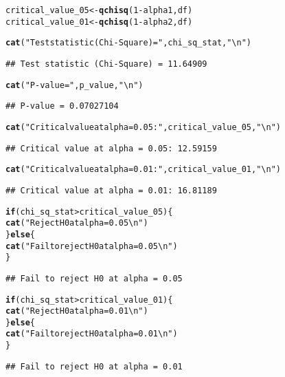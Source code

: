 \documentclass{article}\usepackage[]{graphicx}\usepackage[]{xcolor}
\makeatletter
\newcommand{\hlnum}[1]{\textcolor[rgb]{0.686,0.059,0.569}{#1}}%
\newcommand{\hlsng}[1]{\textcolor[rgb]{0.192,0.494,0.8}{#1}}%
\newcommand{\hlopt}[1]{\textcolor[rgb]{0,0,0}{#1}}%
\newcommand{\hldef}[1]{\textcolor[rgb]{0.345,0.345,0.345}{#1}}%
\newcommand{\hlkwa}[1]{\textcolor[rgb]{0.161,0.373,0.58}{\textbf{#1}}}%
\newcommand{\hlkwb}[1]{\textcolor[rgb]{0.69,0.353,0.396}{#1}}%
\newcommand{\hlkwd}[1]{\textcolor[rgb]{0.737,0.353,0.396}{\textbf{#1}}}%
\newenvironment{kframe}{%
 \def\at@end@of@kframe{}%
 \ifinner\ifhmode%
  \def\at@end@of@kframe{\end{minipage}}%
  \begin{minipage}{\columnwidth}%
 \fi\fi%
 \def\FrameCommand##1{\hskip\@totalleftmargin \hskip-\fboxsep
 \colorbox{shadecolor}{##1}\hskip-\fboxsep
     \hskip-\linewidth \hskip-\@totalleftmargin \hskip\columnwidth}%
 \MakeFramed {\advance\hsize-\width
   \@totalleftmargin\z@ \linewidth\hsize
   \@setminipage}}%
 {\par\unskip\endMakeFramed%
 \at@end@of@kframe}
\newenvironment{knitrout}{}{} %
\makeatother
\begin{document}
\begin{knitrout}
\begin{kframe}
\begin{alltt}
\hldef{critical_value_05} \hlkwb{<-} \hlkwd{qchisq}\hldef{(}\hlnum{1} \hlopt{-} \hldef{alpha1, df)}
\hldef{critical_value_01} \hlkwb{<-} \hlkwd{qchisq}\hldef{(}\hlnum{1} \hlopt{-} \hldef{alpha2, df)}

\hlkwd{cat}\hldef{(}\hlsng{"Test statistic (Chi-Square) ="}\hldef{, chi_sq_stat,} \hlsng{"\textbackslash{}n"}\hldef{)}
\end{alltt}
\begin{verbatim}
## Test statistic (Chi-Square) = 11.64909
\end{verbatim}
\begin{alltt}
\hlkwd{cat}\hldef{(}\hlsng{"P-value ="}\hldef{, p_value,} \hlsng{"\textbackslash{}n"}\hldef{)}
\end{alltt}
\begin{verbatim}
## P-value = 0.07027104
\end{verbatim}
\begin{alltt}
\hlkwd{cat}\hldef{(}\hlsng{"Critical value at alpha = 0.05:"}\hldef{, critical_value_05,} \hlsng{"\textbackslash{}n"}\hldef{)}
\end{alltt}
\begin{verbatim}
## Critical value at alpha = 0.05: 12.59159
\end{verbatim}
\begin{alltt}
\hlkwd{cat}\hldef{(}\hlsng{"Critical value at alpha = 0.01:"}\hldef{, critical_value_01,} \hlsng{"\textbackslash{}n"}\hldef{)}
\end{alltt}
\begin{verbatim}
## Critical value at alpha = 0.01: 16.81189
\end{verbatim}
\begin{alltt}
\hlkwa{if} \hldef{(chi_sq_stat} \hlopt{>} \hldef{critical_value_05) \{}
  \hlkwd{cat}\hldef{(}\hlsng{"Reject H0 at alpha = 0.05\textbackslash{}n"}\hldef{)}
\hldef{\}} \hlkwa{else} \hldef{\{}
  \hlkwd{cat}\hldef{(}\hlsng{"Fail to reject H0 at alpha = 0.05\textbackslash{}n"}\hldef{)}
\hldef{\}}
\end{alltt}
\begin{verbatim}
## Fail to reject H0 at alpha = 0.05
\end{verbatim}
\begin{alltt}
\hlkwa{if} \hldef{(chi_sq_stat} \hlopt{>} \hldef{critical_value_01) \{}
  \hlkwd{cat}\hldef{(}\hlsng{"Reject H0 at alpha = 0.01\textbackslash{}n"}\hldef{)}
\hldef{\}} \hlkwa{else} \hldef{\{}
  \hlkwd{cat}\hldef{(}\hlsng{"Fail to reject H0 at alpha = 0.01\textbackslash{}n"}\hldef{)}
\hldef{\}}
\end{alltt}
\begin{verbatim}
## Fail to reject H0 at alpha = 0.01
\end{verbatim}
\end{kframe}
\end{knitrout}
\end{document}
